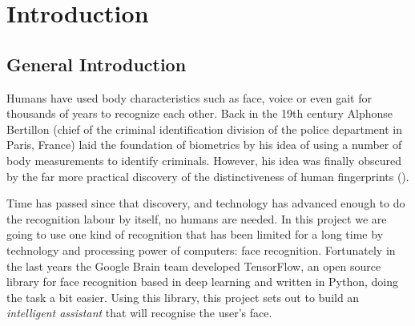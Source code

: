\chapter{Introduction}
\label{introduction}



\section{General Introduction}
Humans have used body characteristics such as face, voice or even gait for thousands of years to recognize each other. Back in the 19th century Alphonse Bertillon (chief of the criminal identification division of the police department in Paris, France) laid the foundation of biometrics by his idea of using a number of body measurements to identify criminals. However, his idea was finally obscured by the far more practical discovery of the distinctiveness of human fingerprints (\cite{jain_biometrics}).

Time has passed since that discovery, and technology has advanced enough to do the recognition labour by itself, no humans are needed. In this project we are going to use one kind of recognition that has been limited for a long time by technology and processing power of computers: face recognition. Fortunately in the last years the Google Brain team developed TensorFlow, an open source library for face recognition based in deep learning and written in Python, doing the task a bit easier. Using this library, this project sets out to build an \textit{intelligent assistant} that will recognise the user's face.


